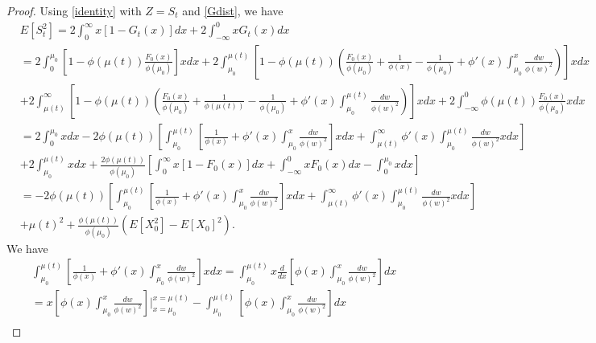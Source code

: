 \documentclass{article}
\numberwithin{equation}{section}
\begin{document}
\begin{proof}
	Using \eqref{identity} with $Z=S_t$ and 
	\eqref{Gdist}, we have
	\begin{align}\label{comp1}&E[S_t^2]
		=2\int_0^\infty x[1-G_t(x)]dx+2\int_{-\infty}^0 xG_t(x)dx\\ 
		&=2\int_{0}^{\mu_0}\left[1-\phi(\mu(t))\frac{F_0(x)}{\phi(\mu_0)} \right]xdx+2\int_{\mu_0}^{\mu(t)}\left[1-\phi(\mu(t))\left(\frac{F_0(x)}{\phi(\mu_0)}+ \frac{1}{\phi(x)}-\frac{1}{\phi(\mu_0)}+\phi'(x)\int_{\mu_0}^{x}\frac{dw}{\phi(w)^2}\right) \right]xdx\nonumber\\
		&+2\int_{\mu(t)}^\infty \left[1-\phi(\mu(t))\left(\frac{F_0(x)}{\phi(\mu_0)}+	\frac{1}{\phi(\mu(t))}-\frac{1}{\phi(\mu_0)}+\phi'(x)\int_{\mu_0}^{\mu(t)}\frac{dw}{\phi(w)^2}\right) \right]xdx+2\int_{-\infty}^{0}\phi(\mu(t))\frac{F_0(x)}{\phi(\mu_0)}xdx\nonumber\\
		&=2\int_{0}^{\mu_0}xdx-2\phi(\mu(t))\left[\int_{\mu_0}^{\mu(t)}\left[\frac{1}{\phi(x)}+ \phi'(x)\int_{\mu_0}^{x}\frac{dw}{\phi(w)^2}\right]xdx+\int_{\mu(t)}^\infty 	\phi'(x)\int_{\mu_0}^{\mu(t)}\frac{dw}{\phi(w)^2} xdx\right]\nonumber\\
		&+2\int_{\mu_0}^{\mu(t)}xdx+\frac{2\phi(\mu(t))}{\phi(\mu_0)}\left[\int_{0}^\infty x [1-F_0(x)]dx+\int_{-\infty}^0 xF_0(x)dx-\int_0^{\mu_0}xdx\right]\nonumber\\
		&=-2\phi(\mu(t))\left[\int_{\mu_0}^{\mu(t)}\left[\frac{1}{\phi(x)}+ \phi'(x)\int_{\mu_0}^{x}\frac{dw}{\phi(w)^2}\right]xdx+\int_{\mu(t)}^\infty 	\phi'(x)\int_{\mu_0}^{\mu(t)}\frac{dw}{\phi(w)^2} xdx\right]\nonumber\\
		&+\mu(t)^2+\frac{\phi(\mu(t))}{\phi(\mu_0)}\left(E[X_0^2]-E[X_0]^2\right).\nonumber
	\end{align}
	We have
	\begin{align}\label{cc1}
		&\int_{\mu_0}^{\mu(t)}\left[\frac{1}{\phi(x)}+ \phi'(x)\int_{\mu_0}^{x}\frac{dw}{\phi(w)^2}\right]xdx=\int_{\mu_0}^{\mu(t)} x\frac{d}{dx}\left[\phi(x)\int_{\mu_0}^{x}\frac{dw}{\phi(w)^2}\right]dx\\
		&= x\left[\phi(x)\int_{\mu_0}^{x}\frac{dw}{\phi(w)^2}\right]\Big|_{x=\mu_0}^{x=\mu(t)}-\int_{\mu_0}^{\mu(t)}\left[\phi(x)\int_{\mu_0}^{x}\frac{dw}{\phi(w)^2}\right]dx\nonumber\\

\end{align}
\end{proof}
\end{document}
